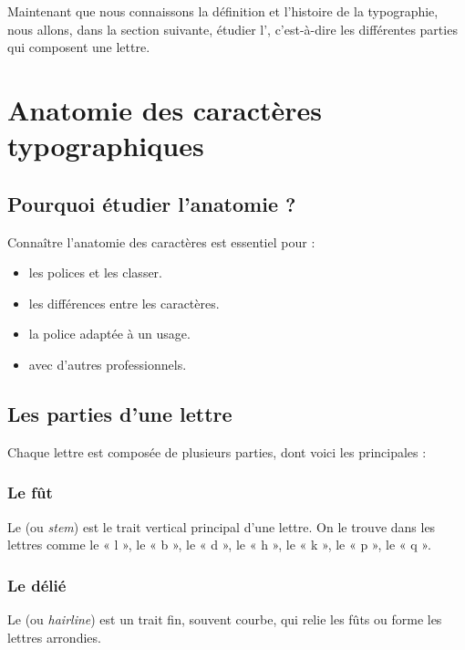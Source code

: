 Maintenant que nous connaissons la définition et l'histoire de la typographie, nous allons, dans la section suivante, étudier l', c'est-à-dire les différentes parties qui composent une lettre.

\section{Anatomie des caractères typographiques}

\subsection{Pourquoi étudier l'anatomie ?}

Connaître l'anatomie des caractères est essentiel pour :

\begin{itemize}
    \item {} les polices et les classer.
    \item {} les différences entre les caractères.
    \item {} la police adaptée à un usage.
    \item {} avec d'autres professionnels.
\end{itemize}

\subsection{Les parties d'une lettre}

Chaque lettre est composée de plusieurs parties, dont voici les principales :

\subsubsection{Le fût}

Le  (ou \emph{stem}) est le trait vertical principal d'une lettre. On le trouve dans les lettres comme le « l », le « b », le « d », le « h », le « k », le « p », le « q ».

\subsubsection{Le délié}

Le  (ou \emph{hairline}) est un trait fin, souvent courbe, qui relie les fûts ou forme les lettres arrondies.

